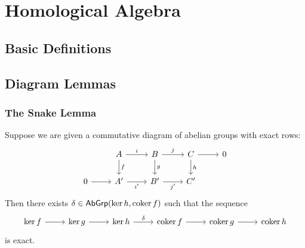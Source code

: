 \chapter{Homological Algebra}
\section*{Basic Definitions}

\section*{Diagram Lemmas}
\subsection*{The Snake Lemma}

\begin{proposition}
	Suppose we are given a commutative diagram of abelian groups with exact rows:
	\begin{equation*}
		\begin{tikzcd}
			& A \arrow[r,"i"]\arrow[d,"f"] & B \arrow[r,"j"]\arrow[d,"g"] & C \arrow[r]\arrow[d,"h"] & 0\\
			0 \arrow[r] & A' \arrow[r,"i'"'] & B' \arrow[r,"j'"'] & C'
		\end{tikzcd}
	\end{equation*}
	Then there exists $\delta \in \mathsf{AbGrp}(\ker h,\operatorname{coker} f)$ such that the sequence
	\begin{equation}
		\begin{tikzcd}
			 \ker f \arrow[r] & \ker g \arrow[r] & \ker h \arrow[r,"\delta"] & \coker f \arrow[r] & \coker g \arrow[r] & \coker h
		 \end{tikzcd}
	\end{equation}
	\noindent is exact.
\end{proposition}

